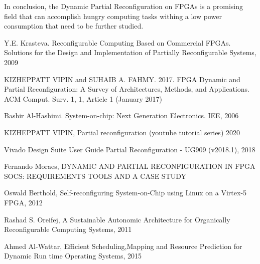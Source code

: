 \documentclass[twoside]{romjist}
\begin{document}
	
	\hspace{0.5cm}In conclusion, the Dynamic Partial Reconfiguration on FPGAs is a promising field that can
	accomplish hungry computing tasks withing a low power consumption that need to be further
	studied.

	\begin{thebibliography}{9}
	
	
	 Y.E. Krasteva. Reconfigurable Computing Based on Commercial FPGAs. Solutions for
	the Design and Implementation of Partially Reconfigurable Systems, 2009
	
	 KIZHEPPATT VIPIN and SUHAIB A. FAHMY. 2017. FPGA Dynamic and Partial
	Reconfiguration: A Survey of Architectures, Methods, and Applications. ACM Comput. Surv. 1,
	1, Article 1 (January 2017)
	
	 Bashir Al-Hashimi. System-on-chip: Next Generation Electronics. IEE, 2006
	
	 KIZHEPPATT VIPIN, Partial reconfiguration (youtube tutorial series) 2020
	
	 Vivado Design Suite User Guide Partial Reconfiguration - UG909 (v2018.1), 2018
	
	 Fernando Moraes, DYNAMIC AND PARTIAL RECONFIGURATION IN FPGA
	SOCS: REQUIREMENTS TOOLS AND A CASE STUDY
	
	 Oswald Berthold, Self-reconfiguring System-on-Chip using Linux
	on a Virtex-5 FPGA, 2012
	
	 Rashad S. Oreifej, A Sustainable Autonomic Architecture for Organically Reconfigurable
	Computing Systems, 2011
	
	 Ahmed Al-Wattar, Efficient Scheduling,Mapping and Resource Prediction for Dynamic
	Run time Operating Systems, 2015
	
	\end{thebibliography}
	
\end{document}
